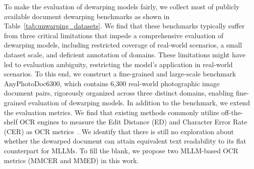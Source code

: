  


To make the evaluation of dewarping models fairly, we collect most of publicly available document dewarping benchmarks as shown in  Table~\ref{tab:unwarping_datasets}. We find that these benchmarks typically suffer from three critical limitations that impede a comprehensive evaluation of dewarping models, including restricted coverage of real-world scenarios, a small dataset scale, and deficient annotation of domains. 
These limitations might have led to evaluation ambiguity, restricting the model's application in real-world scenarios. To this end, we construct a fine-grained and large-scale benchmark AnyPhotoDoc6300, which contains 6,300 real-world photographic image document pairs, rigorously organized across three distinct domains, enabling fine-grained evaluation of dewarping models. In addition to the benchmark, we extend the evaluation metrics. We find that existing methods commonly utilize off-the-shelf OCR engines to measure the Edit Distance (ED) and Character Error Rate (CER) as OCR metrics~\cite {das2019dewarpnet}. 
We identify that there is still no exploration about whether the dewarped document can attain equivalent text readability to its flat counterpart for MLLMs.
To fill the blank, we propose two MLLM-based OCR metrics (MMCER and MMED) in this work. 



